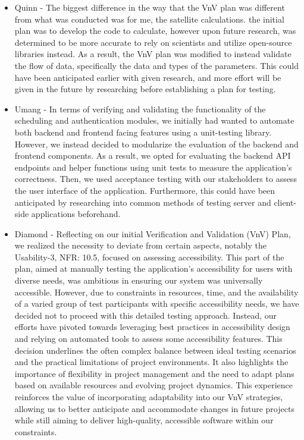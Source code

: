 \documentclass[12pt, titlepage]{article}
\begin{document}
\begin{itemize}
    \item Quinn - The biggest difference in the way that the VnV plan was different from what was conducted was for me, the satellite calculations. the initial plan was to develop the code to calculate, however upon future research, was determined to be more accurate to rely on scientists and utilize open-source libraries instead. As a result, the VnV plan was modified to instead validate the flow of data, specifically the data and types of the parameters. This could have been anticipated earlier with given research, and more effort will be given in the future by researching before establishing a plan for testing.
    \item Umang - In terms of verifying and validating the functionality of the scheduling and authentication modules, we initially had wanted to automate both backend and frontend facing features using a unit-testing library. However, we instead decided to modularize the evaluation of the backend and frontend components. As a result, we opted for evaluating the backend API endpoints and helper functions using unit tests to measure the application's correctness. Then, we used acceptance testing with our stakeholders to assess the user interface of the application. Furthermore, this could have been anticipated by researching into common methods of testing server and client-side applications beforehand.
    \item Diamond - Reflecting on our initial Verification and Validation (VnV) Plan, we realized the necessity to deviate from certain aspects, notably the Usability-3, NFR: 10.5, focused on assessing accessibility. This part of the plan, aimed at manually testing the application's accessibility for users with diverse needs, was ambitious in ensuring our system was universally accessible. However, due to constraints in resources, time, and the availability of a varied group of test participants with specific accessibility needs, we have decided not to proceed with this detailed testing approach. Instead, our efforts have pivoted towards leveraging best practices in accessibility design and relying on automated tools to assess some accessibility features. This decision underlines the often complex balance between ideal testing scenarios and the practical limitations of project environments. It also highlights the importance of flexibility in project management and the need to adapt plans based on available resources and evolving project dynamics. This experience reinforces the value of incorporating adaptability into our VnV strategies, allowing us to better anticipate and accommodate changes in future projects while still aiming to deliver high-quality, accessible software within our constraints.

\end{itemize}
\end{document}
